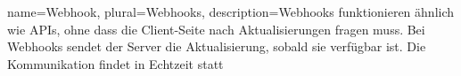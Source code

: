 
 {
    name={Webhook},
    plural={Webhooks},
    description={Webhooks funktionieren ähnlich wie APIs, ohne dass die Client-Seite nach Aktualisierungen fragen muss. Bei Webhooks sendet der Server die Aktualisierung, sobald sie verfügbar ist. Die Kommunikation findet in Echtzeit statt \citep{Tas_webhook}}}





    